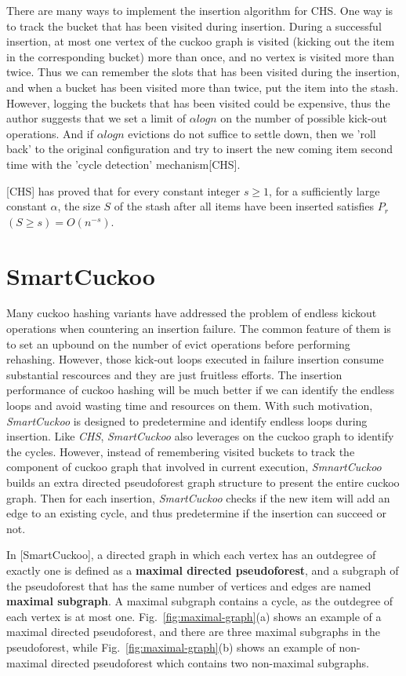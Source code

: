 \documentclass[runningheads]{llncs}
\begin{document}
There are many ways to implement the insertion algorithm for CHS. One way is to track the bucket that has been visited during insertion. During a successful insertion, at most one vertex of the cuckoo graph is visited (kicking out the item in the corresponding bucket) more than once, and no vertex is visited more than twice. Thus we can remember the slots that has been visited during the insertion, and when a bucket has been visited more than twice, put the item into the stash. However, logging the buckets that has been visited could be expensive, thus the author suggests that we set a limit of $\alpha logn$ on the number of possible kick-out operations. And if $\alpha logn$ evictions do not suffice to settle down, then we 'roll back' to the original configuration and try to insert the new coming item second time with the 'cycle detection' mechanism[CHS].

[CHS] has proved that for every constant integer $s\geq 1$, for a sufficiently large constant $\alpha$, the size $S$ of the stash after all items have been inserted satisfies \textbf{$P_r$}$(S\geq s)=O(n^{-s})$.


\section{SmartCuckoo}
\label{sec:smart}
Many cuckoo hashing variants have addressed the problem of endless kickout operations when countering an insertion failure. The common feature of them is to set an upbound on the number of evict operations before performing rehashing. However, those kick-out loops executed in failure insertion consume substantial rescources and they are just fruitless efforts. The insertion performance of cuckoo hashing will be much better if we can identify the endless loops and avoid wasting time and resources on them. With such motivation, \textit{SmartCuckoo} is designed to predetermine and identify endless loops during insertion. Like \textit{CHS}, \textit{SmartCuckoo} also leverages on the cuckoo graph to identify the cycles. However, instead of remembering visited buckets to track the component of cuckoo graph that involved in current execution, \textit{SmnartCuckoo} builds an extra directed pseudoforest graph structure to present the entire cuckoo graph. Then for each insertion, \textit{SmartCuckoo} checks if the new item will add an edge to an existing cycle, and thus predetermine if the insertion can succeed or not.

In [SmartCuckoo], a directed graph in which each vertex has an outdegree of exactly one is defined as a \textbf{maximal directed pseudoforest}, and a subgraph of the pseudoforest that has the same number of vertices and edges are named \textbf{maximal subgraph}. A maximal subgraph contains a cycle, as the outdegree of each vertex is at most one. Fig.~\ref{fig:maximal-graph}(a) shows an example of a maximal directed pseudoforest, and there are three maximal subgraphs in the pseudoforest, while Fig.~\ref{fig:maximal-graph}(b) shows an example of non-maximal directed pseudoforest which contains two non-maximal subgraphs. 
\end{document}
